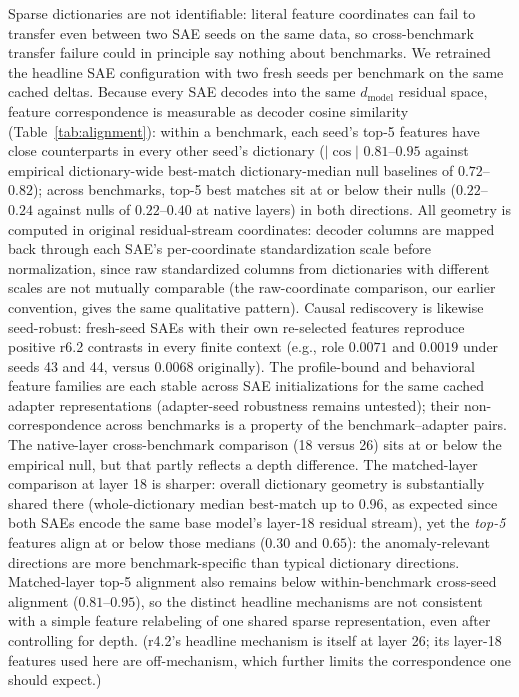 \documentclass[10pt]{article} %
\newcommand{\rsix}{r6.2}
\begin{document}
Sparse dictionaries are not identifiable: literal feature coordinates can fail
to transfer even between two SAE seeds on the same data, so cross-benchmark
transfer failure could in principle say nothing about benchmarks. We retrained
the headline SAE configuration with two fresh seeds per benchmark on the same
cached deltas. Because every SAE decodes into the same $d_{\mathrm{model}}$
residual space, feature correspondence is measurable as decoder cosine
similarity (Table~\ref{tab:alignment}): within a benchmark, each seed's top-5
features have close counterparts in every other seed's dictionary
($|\cos|$ $0.81$--$0.95$ against empirical dictionary-wide best-match
dictionary-median null baselines of $0.72$--$0.82$); across benchmarks,
top-5 best matches sit at or below their nulls ($0.22$--$0.24$ against
nulls of $0.22$--$0.40$ at native layers) in both directions. All geometry
is computed in original residual-stream coordinates: decoder columns are
mapped back through each SAE's per-coordinate standardization scale before
normalization, since raw standardized columns from dictionaries with
different scales are not mutually comparable (the raw-coordinate
comparison, our earlier convention, gives the same qualitative pattern).
Causal rediscovery is likewise seed-robust: fresh-seed SAEs with their own
re-selected features reproduce positive \rsix{} contrasts in every finite
context (e.g., role $0.0071$ and $0.0019$ under seeds 43 and 44, versus
$0.0068$ originally). The profile-bound and behavioral feature families are each stable across
SAE initializations for the same cached adapter representations
(adapter-seed robustness remains untested); their non-correspondence across
benchmarks is a property of the benchmark--adapter pairs. The native-layer
cross-benchmark comparison (18 versus 26) sits at or below the empirical
null, but that partly reflects a depth difference. The matched-layer
comparison at layer 18 is sharper: overall dictionary geometry is
substantially shared there (whole-dictionary median best-match up to
$0.96$, as expected since both SAEs encode the same base model's layer-18
residual stream), yet the \emph{top-5} features align at or below those
medians ($0.30$ and $0.65$): the anomaly-relevant directions are more
benchmark-specific than typical dictionary directions. Matched-layer top-5
alignment also remains below within-benchmark cross-seed alignment
($0.81$--$0.95$), so the distinct headline mechanisms are not consistent
with a simple feature relabeling of one shared sparse representation, even
after controlling for depth. (r4.2's headline mechanism is itself at layer 26;
its layer-18 features used here are off-mechanism, which further limits the
correspondence one should expect.)
\end{document}
